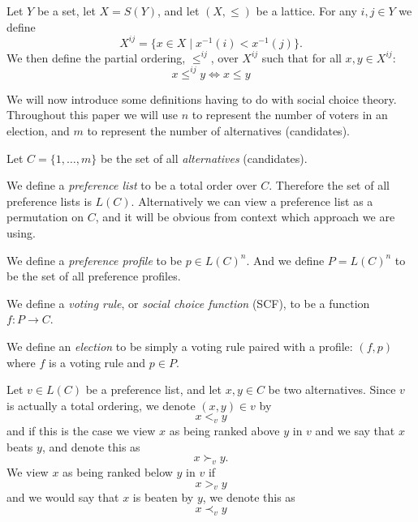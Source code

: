 	\begin{definition}[$X^{ij}, \le^{ij}$]
		\label{identified-lattice-definition}
		Let $Y$ be a set, let $X = S(Y)$, and let $(X, \le)$ be a lattice. For any $i,j \in Y$ we define
		\[
			X^{ij} = \{ x \in X \mid x^{-1}(i) < x^{-1}(j) \}.
		\]
		We then define the partial ordering, $\le^{ij}$, over $X^{ij}$ such that for all $x, y \in X^{ij}$:
		\[
			x \le^{ij} y \iff x \le y
		\]
	\end{definition}

	We will now introduce some definitions having to do with social choice theory. Throughout this paper we will use $n$ to represent the number of voters in an election, and $m$ to represent the number of alternatives (candidates).

	\begin{definition}
		Let $C = \{1, \ldots, m\}$ be the set of all \emph{alternatives} (candidates).
	\end{definition}

	\begin{definition}
		We define a \emph{preference list} to be a total order over $C$. Therefore the set of all preference lists is $L(C)$. Alternatively we can view a preference list as a permutation on $C$, and it will be obvious from context which approach we are using.
	\end{definition}

	\begin{definition}
		We define a \emph{preference profile} to be $p \in L(C)^n$. And we define $P = L(C)^n$ to be the set of all preference profiles.
	\end{definition}

	\begin{definition}
		We define a \emph{voting rule}, or \emph{social choice function} (SCF), to be a function $f : P \to C$.
	\end{definition}

	\begin{definition}
		We define an \emph{election} to be simply a voting rule paired with a profile: $(f, p)$ where $f$ is a voting rule and $p \in P$.
	\end{definition}

	\begin{definition}
		Let $v \in L(C)$ be a preference list, and let $x, y \in C$ be two alternatives. Since $v$ is actually a total ordering, we denote $(x, y) \in v$ by
		\[
			x <_v y
		\]
		and if this is the case we view $x$ as being ranked above $y$ in $v$ and we say that $x$ beats $y$, and denote this as
		\[
			x \succ_v y.
		\]
		We view $x$ as being ranked below $y$ in $v$ if
		\[
			x >_v y
		\]
		and we would say that $x$ is beaten by $y$, we denote this as
		\[
			x \prec_v y
		\]
	\end{definition}

